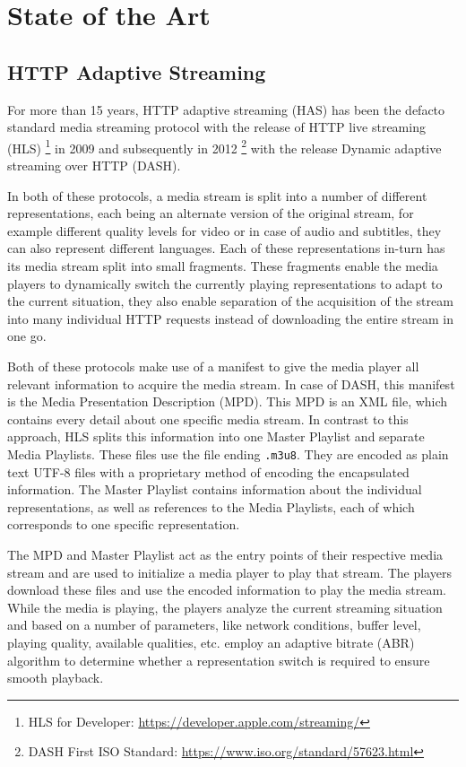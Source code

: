 \chapter{State of the Art\label{cha:chapter2}}

\section{HTTP Adaptive Streaming\label{sec:live}}

For more than 15 years, HTTP adaptive streaming (HAS) has been the defacto standard media streaming protocol with the release of HTTP live streaming (HLS) \footnote{HLS for Developer: \url{https://developer.apple.com/streaming/}} in 2009 \cite{rfc8216} and subsequently in 2012 \footnote{DASH First ISO Standard: \url{https://www.iso.org/standard/57623.html}} with the release Dynamic adaptive streaming over HTTP (DASH).

In both of these protocols, a media stream is split into a number of different representations, each being an alternate version of the original stream, for example different quality levels for video or in case of audio and subtitles, they can also represent different languages. Each of these representations in-turn has its media stream split into small fragments. These fragments enable the media players to dynamically switch the currently playing representations to adapt to the current situation, they also enable separation of the acquisition of the stream into many individual HTTP requests instead of downloading the entire stream in one go.

Both of these protocols make use of a manifest to give the media player all relevant information to acquire the media stream. In case of DASH, this manifest is the Media Presentation Description (MPD). This MPD is an XML \cite{rfc5364} file, which contains every detail about one specific media stream. In contrast to this approach, HLS splits this information into one Master Playlist and separate Media Playlists. These files use the file ending \texttt{.m3u8}. They are encoded as plain text UTF-8 \cite{rfc3629} files with a proprietary method of encoding the encapsulated information. The Master Playlist contains information about the individual representations, as well as references to the Media Playlists, each of which corresponds to one specific representation. 

The MPD and Master Playlist act as the entry points of their respective media stream and are used to initialize a media player to play that stream. The players download these files and use the encoded information to play the media stream. While the media is playing, the players analyze the current streaming situation and based on a number of parameters, like network conditions, buffer level, playing quality, available qualities, etc. employ an adaptive bitrate (ABR) algorithm to determine whether a representation switch is required to ensure smooth playback.

